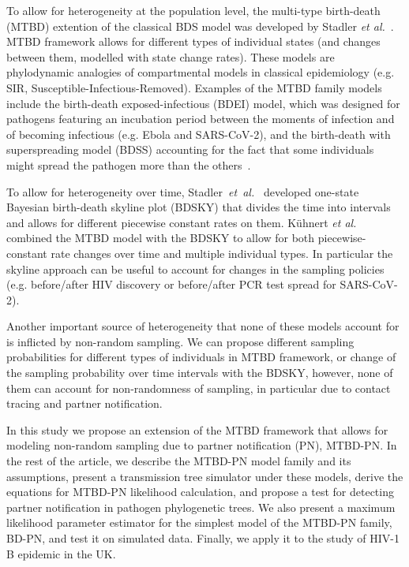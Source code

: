 \documentclass[a4paper,10pt]{article}
\begin{document}
To allow for heterogeneity at the population level, the multi-type birth-death (MTBD) extention of the classical BDS model was developed by Stadler \textit{et al.}~\cite{Stadler2013a}. MTBD framework allows for different types of individual states (and changes between them, modelled with state change rates). These models are phylodynamic analogies of compartmental models in classical epidemiology (e.g. SIR, Susceptible-Infectious-Removed).  Examples of the MTBD family models include the birth-death exposed-infectious (BDEI) model, which was designed for pathogens featuring an incubation period between the moments of infection and of becoming infectious (e.g. Ebola and SARS-CoV-2), and the birth-death with superspreading model (BDSS) accounting for the fact that some individuals might spread the pathogen more than the others~\cite{Stadler2014}.

To allow for heterogeneity over time, Stadler~\textit{et~al.}~\cite{Stadler2013} developed one-state Bayesian birth-death skyline plot (BDSKY) that divides the time into intervals and allows for different piecewise constant rates on them. K\"{u}hnert \textit{et al.}~\cite{Kuhnert2016} combined the MTBD model with the BDSKY to allow for both piecewise-constant rate changes over time and multiple individual types. In particular the skyline approach can be useful to account for changes in the sampling policies (e.g. before/after HIV discovery or before/after PCR test spread for SARS-CoV-2).


Another important source of heterogeneity that none of these models account for is inflicted by non-random sampling. We can propose different sampling probabilities for different types of individuals in MTBD framework, or change of the sampling probability over time intervals with the BDSKY, however, none of them can account for non-randomness of sampling, in particular due to contact tracing and partner notification. 

In this study we propose an extension of the MTBD framework that allows for modeling non-random sampling due to partner notification (PN), MTBD-PN. In the rest of the article, we describe the MTBD-PN model family and its assumptions, present a transmission tree simulator under these models, derive the equations for MTBD-PN likelihood calculation, and propose a test for detecting partner notification in pathogen phylogenetic trees. We also present a maximum likelihood parameter estimator for the simplest model of the MTBD-PN family, BD-PN, and test it on simulated data. Finally, we apply it to the study of HIV-1 B epidemic in the UK. 
\end{document}
